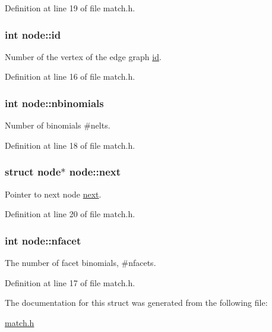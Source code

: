 Definition at line 19 of file match.\-h.

\hypertarget{structnode_a8ceaa10e39f74fdfdae30c68a50074e2}{
\subsubsection[{id}]{\setlength{\rightskip}{0pt plus 5cm}int node\-::id}}\label{structnode_a8ceaa10e39f74fdfdae30c68a50074e2}
Number of the vertex of the edge graph \hyperlink{structnode_a8ceaa10e39f74fdfdae30c68a50074e2}{id}. 

Definition at line 16 of file match.\-h.

\hypertarget{structnode_a19e49943849e91bd93d40fe42e64a1aa}{
\subsubsection[{nbinomials}]{\setlength{\rightskip}{0pt plus 5cm}int node\-::nbinomials}}\label{structnode_a19e49943849e91bd93d40fe42e64a1aa}
Number of binomials \#nelts. 

Definition at line 18 of file match.\-h.

\hypertarget{structnode_aa3e8aa83f864292b5a01210f4453fcc0}{
\subsubsection[{next}]{\setlength{\rightskip}{0pt plus 5cm}struct {\bf node}$\ast$ node\-::next}}\label{structnode_aa3e8aa83f864292b5a01210f4453fcc0}
Pointer to next node \hyperlink{structnode_aa3e8aa83f864292b5a01210f4453fcc0}{next}. 

Definition at line 20 of file match.\-h.

\hypertarget{structnode_a43553d464bfa1156bda24f6fc5624fe6}{
\subsubsection[{nfacet}]{\setlength{\rightskip}{0pt plus 5cm}int node\-::nfacet}}\label{structnode_a43553d464bfa1156bda24f6fc5624fe6}
The number of facet binomials, \#nfacets. 

Definition at line 17 of file match.\-h.



The documentation for this struct was generated from the following file\-:\begin{DoxyCompactItemize}
\item 
\hyperlink{match_8h}{match.\-h}\end{DoxyCompactItemize}
